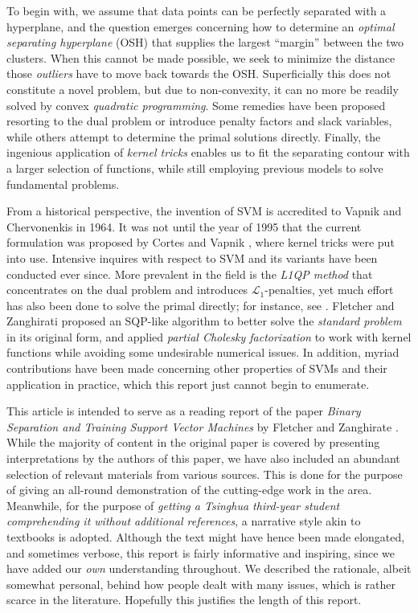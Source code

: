 \documentclass[11pt,a4paper]{article}
\theoremstyle{definition}
\begin{document}
    To begin with, we assume that data points can be perfectly separated with a hyperplane, and the question emerges concerning how to determine an \textit{optimal separating hyperplane} (OSH) that supplies the largest ``margin'' between the two clusters. When this cannot be made possible, we seek to minimize the distance those \textit{outliers} have to move back towards the OSH. Superficially this does not constitute a novel problem, but due to non-convexity, it can no more be readily solved by convex \textit{quadratic programming}. Some remedies have been proposed resorting to the dual problem or introduce penalty factors and slack variables, while others attempt to determine the primal solutions directly. Finally, the ingenious application of \textit{kernel tricks} enables us to fit the separating contour with a larger selection of functions, while still employing previous models to solve fundamental problems.

    From a historical perspective, the invention of SVM is accredited to Vapnik and Chervonenkis \cite{vapnik1964note} in 1964. It was not until the year of 1995 that the current formulation was proposed by Cortes and Vapnik \cite{cortes1995support}, where kernel tricks \cite{boser1992training} were put into use. Intensive inquires with respect to SVM and its variants have been conducted ever since. More prevalent in the field is the \textit{L1QP method} that concentrates on the dual problem and introduces $\mathcal{L}_{1}$-penalties, yet much effort has also been done to solve the primal directly; for instance, see \cite{hesterberg2008least}. Fletcher and Zanghirati \cite{fletcher2010binary} proposed an SQP-like algorithm to better solve the \textit{standard problem} in its original form, and applied \textit{partial Cholesky factorization} to work with kernel functions while avoiding some undesirable numerical issues. In addition, myriad contributions have been made concerning other properties of SVMs and their application in practice, which this report just cannot begin to enumerate.

    This article is intended to serve as a reading report of the paper \textit{Binary Separation and Training Support Vector Machines} by Fletcher and Zanghirate \cite{fletcher2010binary}. While the majority of content in the original paper is covered by presenting interpretations by the authors of this paper, we have also included an abundant selection of relevant materials from various sources. This is done for the purpose of giving an all-round demonstration of the cutting-edge work in the area. Meanwhile, for the purpose of \emph{getting a Tsinghua third-year student comprehending it without additional references}, a narrative style akin to textbooks is adopted. Although the text might have hence been made elongated, and sometimes verbose, this report is fairly informative and inspiring, since we have added our \emph{own} understanding throughout. We described the rationale, albeit somewhat personal, behind how people dealt with many issues, which is rather scarce in the literature. Hopefully this justifies the length of this report.
\end{document}
